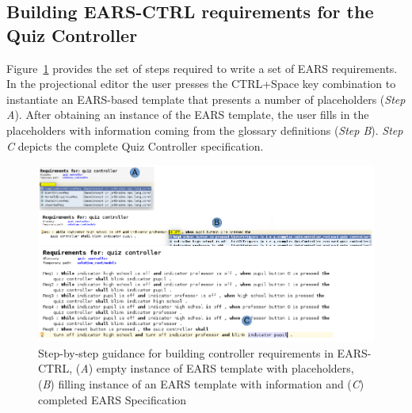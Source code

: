 \subsection{Building \textsf{EARS-CTRL} requirements for the Quiz Controller}
\vspace{-.2cm}
Figure~\ref{fig:EARS_req} provides the set of steps required to write a set of
EARS requirements. In the projectional editor the user presses the CTRL+Space
key combination to instantiate an EARS-based template that presents a number of
placeholders (\emph{Step A}). After obtaining
an instance of the EARS template, the user fills in the placeholders with
information coming from the glossary definitions (\emph{Step B}). \emph{Step C}
depicts the complete Quiz Controller specification.
\begin{figure}[!h]
\centering
\includegraphics[width=1.2\textwidth]{./images/Req_Spec_Steps.png}
\caption{Step-by-step guidance for building controller requirements in
\textsf{EARS-CTRL}, (\emph{A}) empty instance of EARS template with placeholders, (\emph{B}) filling instance
of an EARS template with information and (\emph{C}) completed EARS Specification}
\label{fig:EARS_req}
\end{figure}
\vspace{-.2cm}
